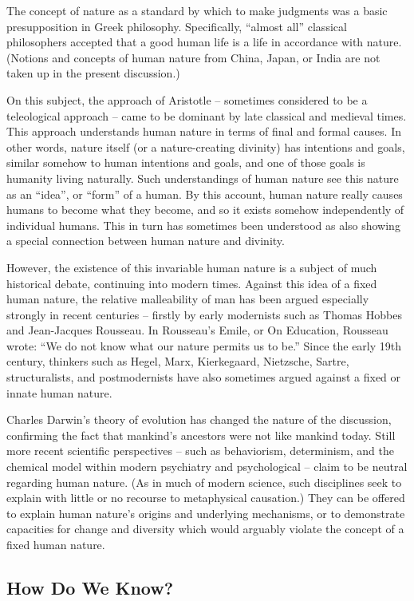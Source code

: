 The concept of nature as a standard by which to make judgments was a basic presupposition in Greek philosophy. Specifically, ``almost all'' classical philosophers accepted that a good human life is a life in accordance with nature. (Notions and concepts of human nature from China, Japan, or India are not taken up in the present discussion.)

On this subject, the approach of Aristotle – sometimes considered to be a teleological approach – came to be dominant by late classical and medieval times. This approach understands human nature in terms of final and formal causes. In other words, nature itself (or a nature-creating divinity) has intentions and goals, similar somehow to human intentions and goals, and one of those goals is humanity living naturally. Such understandings of human nature see this nature as an ``idea'', or ``form'' of a human. By this account, human nature really causes humans to become what they become, and so it exists somehow independently of individual humans. This in turn has sometimes been understood as also showing a special connection between human nature and divinity.

However, the existence of this invariable human nature is a subject of much historical debate, continuing into modern times. Against this idea of a fixed human nature, the relative malleability of man has been argued especially strongly in recent centuries – firstly by early modernists such as Thomas Hobbes and Jean-Jacques Rousseau. In Rousseau’s Emile, or On Education, Rousseau wrote: “We do not know what our nature permits us to be.”  Since the early 19th century, thinkers such as Hegel, Marx, Kierkegaard, Nietzsche, Sartre, structuralists, and postmodernists have also sometimes argued against a fixed or innate human nature.

Charles Darwin’s theory of evolution has changed the nature of the discussion, confirming the fact that mankind’s ancestors were not like mankind today. Still more recent scientific perspectives – such as behaviorism, determinism, and the chemical model within modern psychiatry and psychological – claim to be neutral regarding human nature. (As in much of modern science, such disciplines seek to explain with little or no recourse to metaphysical causation.)  They can be offered to explain human nature’s origins and underlying mechanisms, or to demonstrate capacities for change and diversity which would arguably violate the concept of a fixed human nature.

\subsection{How Do We Know?}


